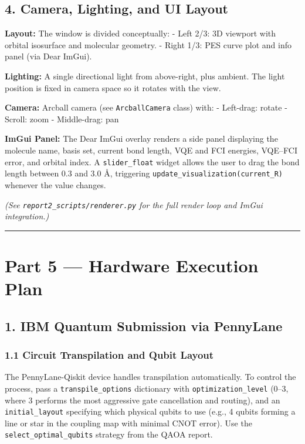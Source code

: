 \documentclass[
  11pt,
]{report}
\begin{document}
\subsection{4. Camera, Lighting, and UI
Layout}\label{camera-lighting-and-ui-layout}

\textbf{Layout:} The window is divided conceptually: - Left 2/3: 3D
viewport with orbital isosurface and molecular geometry. - Right 1/3:
PES curve plot and info panel (via Dear ImGui).

\textbf{Lighting:} A single directional light from above-right, plus
ambient. The light position is fixed in camera space so it rotates with
the view.

\textbf{Camera:} Arcball camera (see \texttt{ArcballCamera} class) with:
- Left-drag: rotate - Scroll: zoom - Middle-drag: pan

\textbf{ImGui Panel:} The Dear ImGui overlay renders a side panel
displaying the molecule name, basis set, current bond length, VQE and
FCI energies, VQE--FCI error, and orbital index. A
\texttt{slider\_float} widget allows the user to drag the bond length
between 0.3 and 3.0 Å, triggering
\texttt{update\_visualization(current\_R)} whenever the value changes.

\emph{(See \texttt{report2\_scripts/renderer.py} for the full render
loop and ImGui integration.)}

\begin{center}\rule{0.5\linewidth}{0.5pt}\end{center}

\section{Part 5 --- Hardware Execution
Plan}\label{part-5-hardware-execution-plan}

\subsection{1. IBM Quantum Submission via
PennyLane}\label{ibm-quantum-submission-via-pennylane}

\subsubsection{1.1 Circuit Transpilation and Qubit
Layout}\label{circuit-transpilation-and-qubit-layout}

The PennyLane-Qiskit device handles transpilation automatically. To
control the process, pass a \texttt{transpile\_options} dictionary with
\texttt{optimization\_level} (0--3, where 3 performs the most aggressive
gate cancellation and routing), and an \texttt{initial\_layout}
specifying which physical qubits to use (e.g., 4 qubits forming a line
or star in the coupling map with minimal CNOT error). Use the
\texttt{select\_optimal\_qubits} strategy from the QAOA report.
\end{document}
